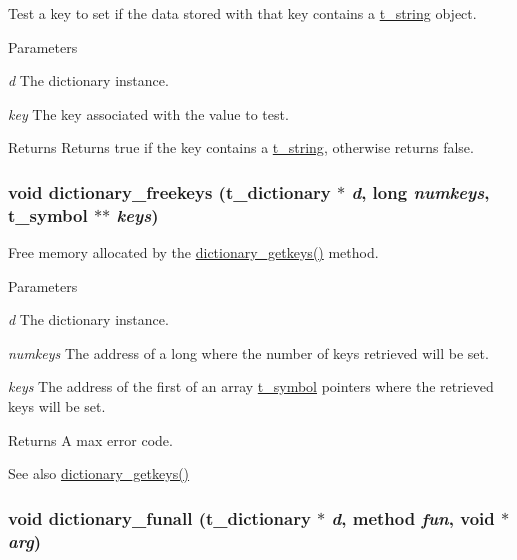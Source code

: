 Test a key to set if the data stored with that key contains a \hyperlink{structt__string}{t\_\-string} object. 
\begin{DoxyParams}{Parameters}
\item[{\em d}]The dictionary instance. \item[{\em key}]The key associated with the value to test. \end{DoxyParams}
\begin{DoxyReturn}{Returns}
Returns true if the key contains a \hyperlink{structt__string}{t\_\-string}, otherwise returns false. 
\end{DoxyReturn}
\hypertarget{group__dictionary_ga38077c67f36917a708c4867351d6444e}{
\subsubsection[{dictionary\_\-freekeys}]{\setlength{\rightskip}{0pt plus 5cm}void dictionary\_\-freekeys ({\bf t\_\-dictionary} $\ast$ {\em d}, \/  long {\em numkeys}, \/  {\bf t\_\-symbol} $\ast$$\ast$ {\em keys})}}
\label{group__dictionary_ga38077c67f36917a708c4867351d6444e}


Free memory allocated by the \hyperlink{group__dictionary_gae595d2340304018ee2b01e1288534ea3}{dictionary\_\-getkeys()} method. 
\begin{DoxyParams}{Parameters}
\item[{\em d}]The dictionary instance. \item[{\em numkeys}]The address of a long where the number of keys retrieved will be set. \item[{\em keys}]The address of the first of an array \hyperlink{structt__symbol}{t\_\-symbol} pointers where the retrieved keys will be set. \end{DoxyParams}
\begin{DoxyReturn}{Returns}
A max error code.
\end{DoxyReturn}
\begin{DoxySeeAlso}{See also}
\hyperlink{group__dictionary_gae595d2340304018ee2b01e1288534ea3}{dictionary\_\-getkeys()} 
\end{DoxySeeAlso}
\hypertarget{group__dictionary_ga923b67932c8401f58dee86cfb3bb5110}{
\subsubsection[{dictionary\_\-funall}]{\setlength{\rightskip}{0pt plus 5cm}void dictionary\_\-funall ({\bf t\_\-dictionary} $\ast$ {\em d}, \/  {\bf method} {\em fun}, \/  void $\ast$ {\em arg})}}
\label{group__dictionary_ga923b67932c8401f58dee86cfb3bb5110}


